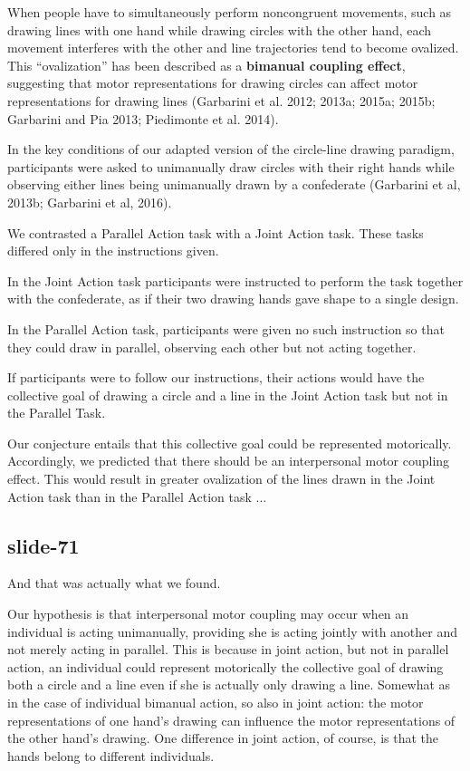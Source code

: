 \documentclass[12pt,\papersize]{extarticle}
\begin{document}
When people have to simultaneously perform noncongruent movements,
such as drawing lines with one hand while drawing circles with the
other hand, each movement interferes with the other and line trajectories
tend to become ovalized. This “ovalization” has been described as a \textbf{bimanual coupling effect},
suggesting that motor representations for drawing circles can affect motor representations
for drawing lines (Garbarini et al. 2012; 2013a; 2015a; 2015b; Garbarini and Pia 2013;
Piedimonte et al. 2014).

In the key conditions of our adapted version of the circle-line drawing paradigm,
participants were asked to unimanually draw circles with their right hands
while observing either lines being unimanually drawn by a confederate (Garbarini et al, 2013b;
Garbarini et al, 2016).

We contrasted a Parallel Action task with a Joint Action task.
These tasks differed only in the instructions given.

In the Joint Action task participants were instructed to perform the task
together with the confederate, as if their two drawing hands gave shape to a single design.

In the Parallel Action task, participants were given no such instruction so that
they could draw in parallel, observing each other but not acting together.

If participants were to follow our instructions, their actions would have
the collective goal of drawing a circle and a line in the Joint Action task but not in
the Parallel Task.

Our conjecture entails that this collective goal could be represented motorically.
Accordingly, we predicted that there should be an interpersonal motor coupling effect.
This would result in greater ovalization of the lines drawn in the Joint Action task
than in the Parallel Action task ...

\subsection{slide-71}
And that was actually what we found.

Our hypothesis is that interpersonal motor coupling may occur when an individual is acting unimanually, providing she is acting jointly with another and not merely acting in parallel. This is because in joint action, but not in parallel action, an individual could represent motorically the collective goal of drawing both a circle and a line even if she is actually only drawing a line. Somewhat as in the case of individual bimanual action, so also in joint action: the motor representations of one hand’s drawing can influence the motor representations of the other hand’s drawing.  One difference in joint action, of course, is that the hands belong to different individuals.
\end{document}

